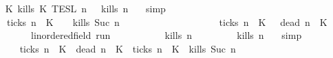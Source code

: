 \begin{isabellebody}
\ \ \isamarkupfalse%
\ {\isacartoucheopen}{\isasymlbrakk}\ K\ kills\ K\ {\isasymrbrakk}\isactrlsub T\isactrlsub E\isactrlsub S\isactrlsub L\isactrlbsup {\isasymge}\ n\isactrlesup \ {\isacharequal}\ {\isacharbraceleft}{\isasymrho}{\isachardot}\ {\isacharquery}kills\ n\ {\isasymrho}{\isacharbraceright}{\isacartoucheclose}\ \isamarkupfalse%
\ simp\isanewline
\ \ \isamarkupfalse%
\ \isamarkupfalse%
\ {\isacartoucheopen}{\isachardot}{\isachardot}{\isachardot}\ {\isacharequal}\ {\isacharparenleft}{\isacharbraceleft}{\isasymrho}{\isachardot}\ {\isasymnot}\ {\isacharquery}ticks\ n\ {\isasymrho}\ K\ \ {\isasyminter}\ {\isacharbraceleft}{\isasymrho}{\isachardot}\ {\isacharquery}kills\ {\isacharparenleft}Suc\ n{\isacharparenright}\ {\isasymrho}{\isacharbraceright}{\isacharparenright}\isanewline
\ \ \ \ \ \ \ \ \ \ \ \ \ \ \ \ \ {\isasymunion}\ {\isacharparenleft}{\isacharbraceleft}{\isasymrho}{\isachardot}\ {\isacharquery}ticks\ n\ {\isasymrho}\ K\ {\isasyminter}\ {\isacharbraceleft}{\isasymrho}{\isachardot}\ {\isacharquery}dead\ n\ {\isasymrho}\ K\isanewline
\ \ \isamarkupfalse%
\isanewline
\ \ \ \ \isacommand{{\isacharbraceleft}}\isamarkupfalse%
\ \isamarkupfalse%
\ {\isasymrho}{\isacharcolon}{\isacharcolon}{\isacartoucheopen}{\isacharprime}{\isasymtau}{\isacharcolon}{\isacharcolon}linordered{\isacharunderscore}field\ run{\isacartoucheclose}\isanewline
\ \ \ \ \ \ \isamarkupfalse%
\ {\isacartoucheopen}{\isasymrho}\ {\isasymin}\ {\isacharbraceleft}{\isasymrho}{\isachardot}\ {\isacharquery}kills\ n\ {\isasymrho}{\isacharbraceright}{\isacartoucheclose}\isanewline
\ \ \ \ \ \ \isamarkupfalse%
\ {\isacartoucheopen}{\isacharquery}kills\ n\ {\isasymrho}{\isacartoucheclose}\ \isamarkupfalse%
\ simp\isanewline
\ \ \ \ \ \ \isamarkupfalse%
\ {\isacartoucheopen}{\isacharparenleft}{\isacharquery}ticks\ n\ {\isasymrho}\ K\ {\isasymand}\ {\isacharquery}dead\ n\ {\isasymrho}\ K\ {\isasymor}\ {\isacharparenleft}{\isasymnot}{\isacharquery}ticks\ n\ {\isasymrho}\ K\ {\isasymand}\ {\isacharquery}kills\ {\isacharparenleft}Suc\ n{\isacharparenright}\ {\isasymrho}{\isacharparenright}{\isacartoucheclose}\isanewline

\end{isabellebody}
